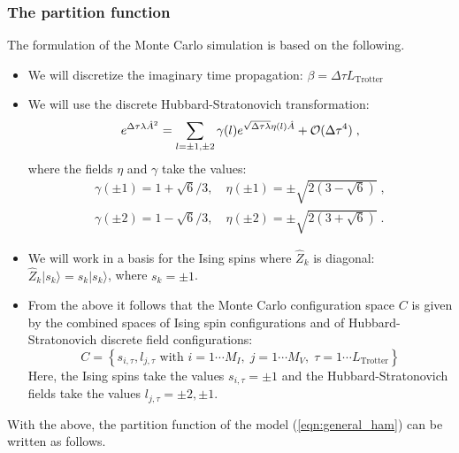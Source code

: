 \subsubsection{The partition function}
The formulation of the  Monte Carlo simulation is based on the following.
\begin{itemize}
\item  We will discretize the imaginary time propagation: $\beta = \Delta \tau L_{\text{Trotter}} $
\item  We will use  the   discrete Hubbard-Stratonovich transformation:
\begin{equation}
\label{HS_squares}
        e^{\Delta \tau  \lambda  \hat{A}^2 } =
        \sum_{ l = \pm 1, \pm 2}  \gamma(l)
e^{ \sqrt{\Delta \tau \lambda }
       \eta(l)  \hat{A} }
                + {\cal O} (\Delta \tau ^4)\;,
\end{equation}
where the fields $\eta$ and $\gamma$ take the values:
\begin{eqnarray}
 \gamma(\pm 1)  = 1 + \sqrt{6}/3, \quad  \eta(\pm 1 ) = \pm \sqrt{2 \left(3 - \sqrt{6} \right)}\;,\\\nonumber
  \gamma(\pm 2) = 1 - \sqrt{6}/3, \quad  \eta(\pm 2 ) = \pm \sqrt{2 \left(3 + \sqrt{6} \right)}\;.
\nonumber
\end{eqnarray}
\item  We will work in  a basis for the Ising spins  where  $\hat{Z}_k$ is diagonal: $\hat{Z}_{k}|s_{k}\rangle = s_{k}|s_{k}\rangle$, where $s_{k}=\pm 1$.
\item From the above it follows that the  Monte Carlo configuration space $C$  
is given by the combined spaces of Ising spin configurations  and of Hubbard-Stratonovich discrete field configurations:
\begin{equation}
	C = \left\{   s_{i,\tau} ,  l_{j,\tau}  \text{ with }  i=1\cdots M_I,\;  j = 1\cdots M_V,\; \tau=1\cdots L_{\mathrm{Trotter}}  \right\}
\end{equation}
Here, the Ising spins take the values  $s_{i,\tau} = \pm 1$ and  the Hubbard-Stratonovich fields take the values  $l_{j,\tau}  = \pm 2, \pm 1 $.
\end{itemize}
With the above, the partition function of the model (\ref{eqn:general_ham}) can be written as follows.
